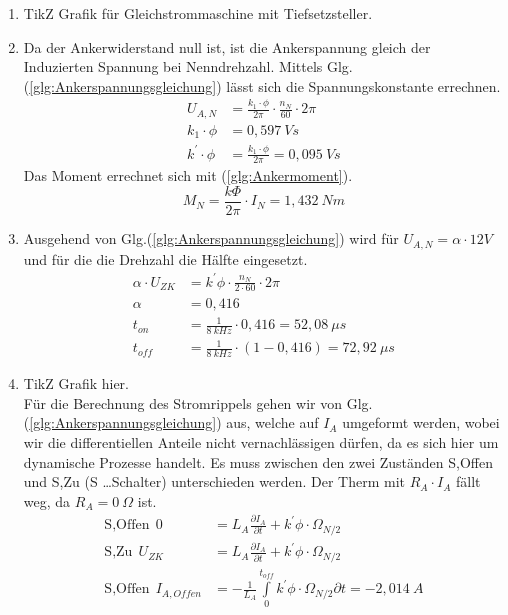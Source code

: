 \begin{solution}
\begin{enumerate}
\item TikZ Grafik für Gleichstrommaschine mit Tiefsetzsteller.
\item Da der Ankerwiderstand null ist, ist die Ankerspannung gleich der Induzierten Spannung bei Nenndrehzahl. Mittels Glg.(\ref{glg:Ankerspannungsgleichung}) lässt sich die Spannungskonstante errechnen.
\begin{align}
U_{A,N} &= \frac{k_1 \cdot \phi}{2 \pi} \cdot \frac{n_N}{60} \cdot 2 \pi\\
k_1 \cdot \phi &= 0,597~Vs\\
k^{'} \cdot \phi &= \frac{k_1 \cdot \phi}{2 \pi} = 0,095~Vs
\end{align}
Das Moment errechnet sich mit (\ref{glg:Ankermoment}).\\
\begin{equation}
M_N=\frac{k \Phi}{2 \pi} \cdot I_N =1,432~Nm
\end{equation}
\item Ausgehend von Glg.(\ref{glg:Ankerspannungsgleichung}) wird für $U_{A,N} = \alpha \cdot 12V$ und für die die Drehzahl die Hälfte eingesetzt.
\begin{align}
\alpha \cdot U_{ZK} &= k^{'} \phi \cdot \frac{n_N}{2 \cdot 60} \cdot 2 \pi \\
\alpha &= 0,416\\
t_{on} &= \frac{1}{8~kHz} \cdot 0,416 = 52,08~\mu s\\
t_{off} &= \frac{1}{8~kHz} \cdot(1- 0,416) = 72,92~\mu s
\end{align}
\item TikZ Grafik hier.\\
Für die Berechnung des Stromrippels gehen wir von Glg.(\ref{glg:Ankerspannungsgleichung}) aus, welche auf $I_A$ umgeformt werden, wobei wir die differentiellen Anteile nicht vernachlässigen dürfen, da es sich hier um dynamische Prozesse handelt. Es muss zwischen den zwei Zuständen S,Offen und S,Zu (S \dots Schalter) unterschieden werden. Der Therm mit $R_A \cdot I_A$ fällt weg, da $R_A= 0~\Omega$ ist.
\begin{align}
\text{S,Offen}~~ 0 &= L_A \frac{\partial I_A}{\partial t} + k^{'} \phi \cdot \Omega_{N/2}\\
\text{S,Zu}~~ U_{ZK} &= L_A \frac{\partial I_A}{\partial t} + k^{'} \phi \cdot \Omega_{N/2}\\
\text{S,Offen} ~~ I_{A,Offen} &= -\frac{1}{L_A} \int \limits_{0}^{t_{off}} k^{'} \phi \cdot \Omega_{N/2} \partial t=-2,014~A\\

\end{align}
\end{enumerate}
\end{solution}
